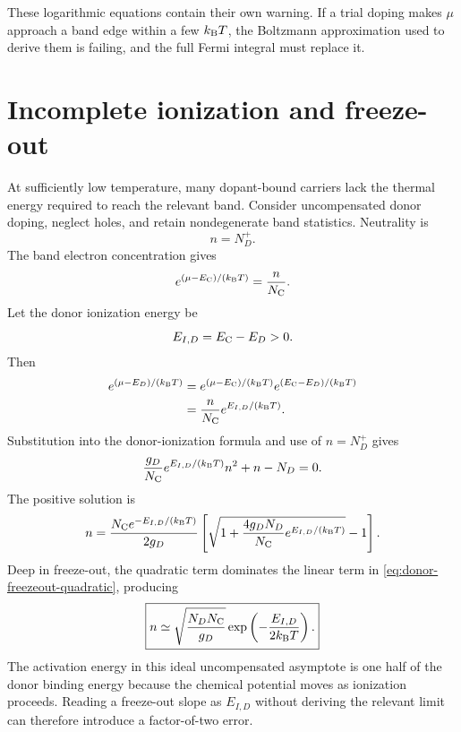 These logarithmic equations contain their own warning.  If a trial doping makes
$\mu$ approach a band edge within a few $k_{\mathrm B} T$, the Boltzmann approximation
used to derive them is failing, and the full Fermi integral must replace it.

\section{Incomplete ionization and freeze-out}

At sufficiently low temperature, many dopant-bound carriers lack the thermal
energy required to reach the relevant band.  Consider uncompensated donor
doping, neglect holes, and retain nondegenerate band statistics.  Neutrality is
\begin{equation}
  n=N_D^+.
  \label{eq:freezeout-donor-neutrality}
\end{equation}
The band electron concentration gives
\begin{equation}
  e^{(\mu-E_{\mathrm C})/(k_{\mathrm B} T)}=\frac{n}{N_{\mathrm C}}.
  \label{eq:freezeout-eliminate-mu-1}
\end{equation}
Let the donor ionization energy be
\begin{equation}
  E_{I,D}=E_{\mathrm C}-E_D>0.
  \label{eq:donor-ionization-energy}
\end{equation}
Then
\begin{equation}
\begin{aligned}
  e^{(\mu-E_D)/(k_{\mathrm B} T)}
  &=e^{(\mu-E_{\mathrm C})/(k_{\mathrm B} T)}
    e^{(E_{\mathrm C}-E_D)/(k_{\mathrm B} T)}\\
  &=\frac{n}{N_{\mathrm C}}e^{E_{I,D}/(k_{\mathrm B} T)}.
\end{aligned}
  \label{eq:freezeout-eliminate-mu-2}
\end{equation}
Substitution into the donor-ionization formula and use of $n=N_D^+$ gives
\begin{equation}
  \frac{g_D}{N_{\mathrm C}}e^{E_{I,D}/(k_{\mathrm B} T)}n^2+n-N_D=0.
  \label{eq:donor-freezeout-quadratic}
\end{equation}
The positive solution is
\begin{equation}
  n
  =\frac{N_{\mathrm C} e^{-E_{I,D}/(k_{\mathrm B} T)}}{2g_D}
   \left[
     \sqrt{1+\frac{4g_DN_D}{N_{\mathrm C}}
       e^{E_{I,D}/(k_{\mathrm B} T)}}-1
   \right].
  \label{eq:donor-freezeout-exact-quadratic-solution}
\end{equation}
Deep in freeze-out, the quadratic term dominates the linear term in
\cref{eq:donor-freezeout-quadratic}, producing
\begin{equation}
  \boxed{
  n\simeq
  \sqrt{\frac{N_DN_{\mathrm C}}{g_D}}
  \exp\left(-\frac{E_{I,D}}{2k_{\mathrm B} T}\right).
  }
  \label{eq:donor-freezeout-asymptote}
\end{equation}
The activation energy in this ideal uncompensated asymptote is one half of the
donor binding energy because the chemical potential moves as ionization
proceeds.  Reading a freeze-out slope as $E_{I,D}$ without deriving the relevant
limit can therefore introduce a factor-of-two error.

